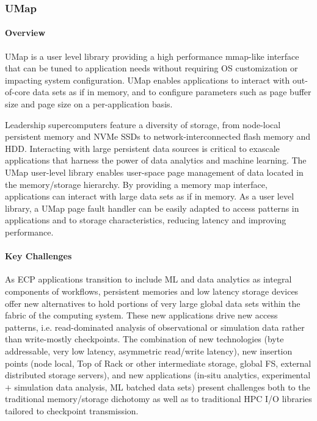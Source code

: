 \subsubsection*{UMap}

\paragraph{Overview}

UMap is a user level library providing a high performance mmap-like
interface that can be tuned to application needs without requiring OS
customization or impacting system configuration. UMap enables
applications to interact with out-of-core data sets as if in memory,
and to configure parameters such as page buffer size and page size on
a per-application basis.

Leadership supercomputers feature a diversity of storage, from
node-local persistent memory and NVMe SSDs to network-interconnected
flash memory and HDD. Interacting with large persistent data sources
is critical to exascale applications that harness the power of data
analytics and machine learning. The UMap user-level library enables
user-space page management of data located in the memory/storage
hierarchy. By providing a memory map interface, applications can
interact with large data sets as if in memory. As a user level
library, a UMap page fault handler can be easily adapted to access
patterns in applications and to storage characteristics, reducing latency
and improving performance.

\paragraph{Key Challenges}

As ECP applications transition to include ML and data analytics as
integral components of workflows, persistent memories and low latency
storage devices offer new alternatives to hold portions of very large
global data sets within the fabric of the computing system. These new
applications drive new access patterns, i.e. read-dominated analysis
of observational or simulation data rather than write-mostly
checkpoints. The combination of new technologies (byte addressable,
very low latency, asymmetric read/write latency), new insertion points
(node local, Top of Rack or other intermediate storage, global FS,
external distributed storage servers), and new applications (in-situ
analytics, experimental $+$ simulation data analysis, ML batched data
sets) present challenges both to the traditional memory/storage
dichotomy as well as to traditional HPC I/O libraries tailored to
checkpoint transmission.


